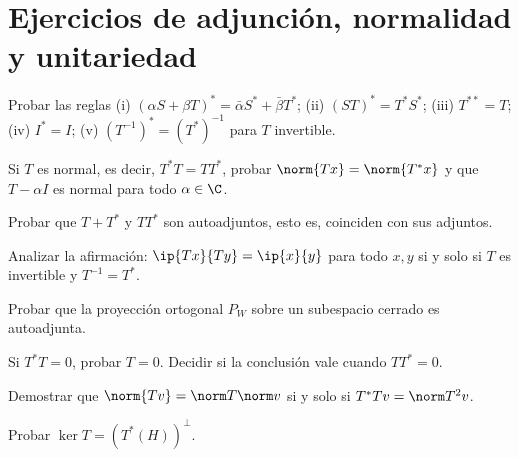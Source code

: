 \section{Ejercicios de adjunción, normalidad y unitariedad}

\begin{ejercicio}\label{ej:lectura-32-1}
Probar las reglas (i) $(\alpha S+\beta T)^*=\bar\alpha S^*+\bar\beta T^*$; (ii) $(ST)^*=T^*S^*$; (iii) $T^{**}=T$; (iv) $I^*=I$; (v) $(T^{-1})^*=(T^*)^{-1}$ para $T$ invertible.
\end{ejercicio}


\begin{ejercicio}\label{ej:lectura-32-2}
Si $T$ es normal, es decir, $T^*T=TT^*$, probar $\norm{Tx}=\norm{T^*x}$ y que $T-\alpha I$ es normal para todo $\alpha\in\C$.
\end{ejercicio}


\begin{ejercicio}\label{ej:lectura-32-3}
Probar que $T+T^*$ y $TT^*$ son autoadjuntos, esto es, coinciden con sus adjuntos.
\end{ejercicio}


\begin{ejercicio}\label{ej:lectura-32-4}
Analizar la afirmación: $\ip{Tx}{Ty}=\ip{x}{y}$ para todo $x,y$ si y solo si $T$ es invertible y $T^{-1}=T^*$.
\end{ejercicio}


\begin{ejercicio}\label{ej:lectura-32-5}
Probar que la proyección ortogonal $P_W$ sobre un subespacio cerrado es autoadjunta.
\end{ejercicio}


\begin{ejercicio}\label{ej:lectura-32-6}
Si $T^*T=0$, probar $T=0$. Decidir si la conclusión vale cuando $TT^*=0$.
\end{ejercicio}


\begin{ejercicio}\label{ej:lectura-32-7}
Demostrar que $\norm{Tv}=\norm T\norm v$ si y solo si $T^*Tv=\norm T^{2}v$.
\end{ejercicio}


\begin{ejercicio}\label{ej:lectura-32-8}
Probar $\ker T=(T^*(H))^{\perp}$.
\end{ejercicio}


